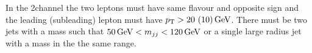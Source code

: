 In the 2\Pl channel the two leptons must have same flavour and opposite sign
and the leading (subleading) lepton must have $p_{\mathrm{T}} > 20\ (10) \,\text{Ge\hspace{-.08em}V}$.
There must be two jets with a mass such that $50\,\text{Ge\hspace{-.08em}V} < m_{jj} < 120\,\text{Ge\hspace{-.08em}V}$
or a single large radius jet with a mass in the the same range.

